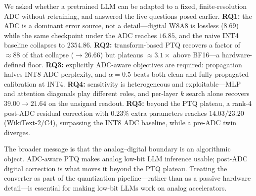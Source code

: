 \documentclass[letterpaper]{article} %
\theoremstyle{plain}
\begin{document}
We asked whether a pretrained LLM can be adapted to a fixed, finite-resolution ADC without retraining, and answered the five questions posed earlier. \textbf{RQ1:} the ADC is a dominant error source, not a detail---digital W8A8 is lossless ($8.69$) while the same checkpoint under the ADC reaches $16.85$, and the naive INT4 baseline collapses to $2354.86$. \textbf{RQ2:} transform-based PTQ recovers a factor of ${\approx}88$ of that collapse ($\to 26.66$) but plateaus ${\approx}3.1\times$ above BF16---a hardware-defined floor. \textbf{RQ3:} explicitly ADC-aware objectives are required: propagation halves INT8 ADC perplexity, and $\alpha = 0.5$ beats both clean and fully propagated calibration at INT4. \textbf{RQ4:} sensitivity is heterogeneous and exploitable---MLP and attention diagonals play different roles, and per-layer $k$ search alone recovers $39.00 \to 21.64$ on the unsigned readout. \textbf{RQ5:} beyond the PTQ plateau, a rank-4 post-ADC residual correction with $0.23\%$ extra parameters reaches $14.03/23.20$ (WikiText-2/C4), surpassing the INT8 ADC baseline, while a pre-ADC twin diverges.

The broader message is that the analog--digital boundary is an algorithmic object. ADC-aware PTQ makes analog low-bit LLM inference usable; post-ADC digital correction is what moves it beyond the PTQ plateau. Treating the converter as part of the quantization pipeline---rather than as a passive hardware detail---is essential for making low-bit LLMs work on analog accelerators.


\end{document}
